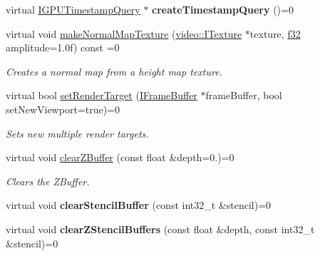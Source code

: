 \begin{DoxyCompactItemize}
\item 
virtual \hyperlink{classirr_1_1video_1_1IGPUTimestampQuery}{I\+G\+P\+U\+Timestamp\+Query} $\ast$ {\bfseries create\+Timestamp\+Query} ()=0\hypertarget{classirr_1_1video_1_1IVideoDriver_a144176498753bebd35210bfc443a3c44}{}\label{classirr_1_1video_1_1IVideoDriver_a144176498753bebd35210bfc443a3c44}

\item 
virtual void \hyperlink{classirr_1_1video_1_1IVideoDriver_a6b349355b288c0b4ec69271e0d5cfc6b}{make\+Normal\+Map\+Texture} (\hyperlink{classirr_1_1video_1_1ITexture}{video\+::\+I\+Texture} $\ast$texture, \hyperlink{namespaceirr_a0277be98d67dc26ff93b1a6a1d086b07}{f32} amplitude=1.\+0f) const  =0
\begin{DoxyCompactList}\small\item\em Creates a normal map from a height map texture. \end{DoxyCompactList}\item 
virtual bool \hyperlink{classirr_1_1video_1_1IVideoDriver_a6ae8e7ce16215e5d0e8a0c155029aaa1}{set\+Render\+Target} (\hyperlink{classirr_1_1video_1_1IFrameBuffer}{I\+Frame\+Buffer} $\ast$frame\+Buffer, bool set\+New\+Viewport=true)=0\hypertarget{classirr_1_1video_1_1IVideoDriver_a6ae8e7ce16215e5d0e8a0c155029aaa1}{}\label{classirr_1_1video_1_1IVideoDriver_a6ae8e7ce16215e5d0e8a0c155029aaa1}

\begin{DoxyCompactList}\small\item\em Sets new multiple render targets. \end{DoxyCompactList}\item 
virtual void \hyperlink{classirr_1_1video_1_1IVideoDriver_a1cdd936731066604668e7be11cfead8d}{clear\+Z\+Buffer} (const float \&depth=0.)=0
\begin{DoxyCompactList}\small\item\em Clears the Z\+Buffer. \end{DoxyCompactList}\item 
virtual void {\bfseries clear\+Stencil\+Buffer} (const int32\+\_\+t \&stencil)=0\hypertarget{classirr_1_1video_1_1IVideoDriver_a9f7f193f3f4a76a9fc55caf8687570b0}{}\label{classirr_1_1video_1_1IVideoDriver_a9f7f193f3f4a76a9fc55caf8687570b0}

\item 
virtual void {\bfseries clear\+Z\+Stencil\+Buffers} (const float \&depth, const int32\+\_\+t \&stencil)=0\hypertarget{classirr_1_1video_1_1IVideoDriver_a295d58e3c6e84878f495404889740d77}{}\label{classirr_1_1video_1_1IVideoDriver_a295d58e3c6e84878f495404889740d77}


\end{DoxyCompactItemize}
